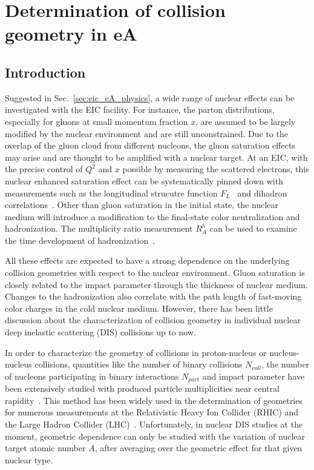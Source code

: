 \chapter{Determination of collision geometry in eA} \label{chp:geometry}


\section{Introduction}
Suggested in Sec.~\ref{sec:eic_eA_physics}, a wide range of nuclear effects can be
investigated with the EIC facility. For instance, the parton distributions,
especially for gluons at small momentum fraction $x$, are assumed to be largely modified by
the nuclear environment and are still unconstrained. Due to the overlap
of the gluon cloud from different nucleons, the gluon saturation effects may arise
and are thought to be amplified with a nuclear target. At an EIC, with the precise control
of $Q^{2}$ and $x$ possible by measuring the scattered electrons, this nuclear enhanced
saturation effect can be systematically pinned down with measurements such as the
longitudinal strucutre function $F_{L}$~\cite{Albacete:2009fh} and dihadron
correlations~\cite{Dominguez:2011wm}. Other than gluon saturation in the initial
state, the nuclear medium will introduce a modification to the final-state color
neutralization and hadronization. The multiplicity ratio measurement $R^{h}_{A}$
can be used to examine the time development of hadronization~\cite{Accardi:2007in}.
 
All these effects are expected to have a strong dependence on the underlying
collision geometries with respect to the nuclear environment. Gluon saturation
is closely related to the impact parameter through the thickness of nuclear
medium. Changes to the hadronization also correlate with the path length of
fast-moving color charges in the cold nuclear medium. However, there has been
little discussion about the characterization of collision geometry in individual
nuclear deep inelastic scattering (DIS) collisions up to now.

In order to characterize the geometry of collisions in proton-nucleus or nucleus-nucleus collisions, quantities
like the number of binary collisions $N_{coll}$, the number of nucleons participating in
binary interactions $N_{part}$ and impact parameter have been extensively
studied with produced particle multiplicities near central rapidity~\cite{Broniowski:2001ei}. This method has been widely used in
the determination of geometries for numerous measurements at the Relativistic Heavy Ion Collider (RHIC) and
the Large Hadron Collider (LHC)~\cite{Aamodt:2010cz,Abelev:2008ab,Back:2002uc}. Unfortunately, in
nuclear DIS studies at the moment, geometric dependence
can only be studied with the variation of nuclear target atomic number $A$,
after averaging over the geometric effect for that given nuclear type.  


